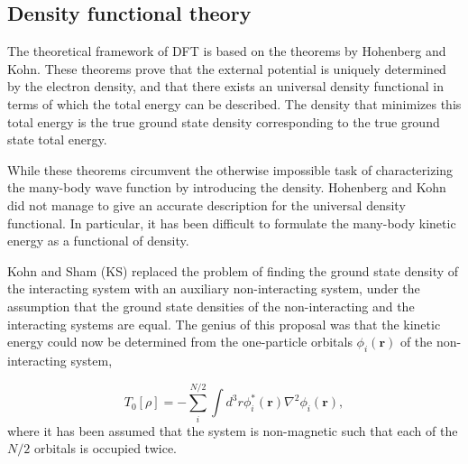 \documentclass[12pt,a4paper,twoside]{article}
\numberwithin{equation}{section}
\renewcommand{\_}{\textscale{.7}{\textunderscore}}
\begin{document}
\subsection{Density functional theory}
The theoretical framework of DFT is based on the theorems by Hohenberg and Kohn\cite{Hohenberg-Kohn}. These theorems prove that the external potential is uniquely determined by the electron density, and that there exists an universal density functional in terms of which the total energy can be described. The density that minimizes this total energy is the true ground state density corresponding to the true ground state total energy. 

While these theorems circumvent the otherwise impossible task of characterizing the many-body wave function by introducing the density. Hohenberg and Kohn did not manage to give an accurate description for the universal density functional. In particular, it has been difficult to formulate the many-body kinetic energy as a functional of density.

Kohn and Sham (KS) replaced the problem of finding the ground state density of the interacting system with an auxiliary non-interacting system, under the assumption that the ground state densities of the non-interacting and the interacting systems are equal\cite{Kohn-Sham}. The genius of this proposal was that the kinetic energy could now be determined from the one-particle orbitals $\phi_i(\textbf{r})$ of the non-interacting system, 

\begin{equation}
    T_0[\rho] = -\sum_{i}^{N/2}\int d^3r \phi_i^*(\textbf{r})\nabla^2\phi_i(\textbf{r}), 
\end{equation}
where it has been assumed that the system is non-magnetic such that each of the $N/2$ orbitals is occupied twice.
\end{document}
